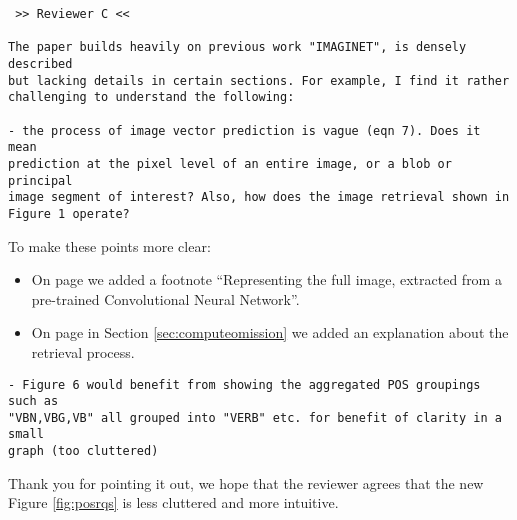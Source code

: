 \documentclass{article}
\begin{document}
\begin{verbatim}
 >> Reviewer C <<

The paper builds heavily on previous work "IMAGINET", is densely described
but lacking details in certain sections. For example, I find it rather
challenging to understand the following:

- the process of image vector prediction is vague (eqn 7). Does it mean
prediction at the pixel level of an entire image, or a blob or principal
image segment of interest? Also, how does the image retrieval shown in
Figure 1 operate?

\end{verbatim}

To make these points more clear:

\begin{itemize}
	\item On page \pageref{edit:dumdumeddy} we 
added a footnote ``Representing the full image, extracted from 
a pre-trained Convolutional Neural Network''.
	\item On page \pageref{edit:retrievalexplain} in Section 
	\ref{sec:computeomission} we added an explanation about the retrieval
	process.
\end{itemize}

\begin{verbatim}
- Figure 6 would benefit from showing the aggregated POS groupings such as
"VBN,VBG,VB" all grouped into "VERB" etc. for benefit of clarity in a small
graph (too cluttered)
\end{verbatim}

Thank you for pointing it out, we hope that the reviewer agrees that 
the new Figure \ref{fig:posrqs} is less cluttered and more intuitive.
\end{document}
